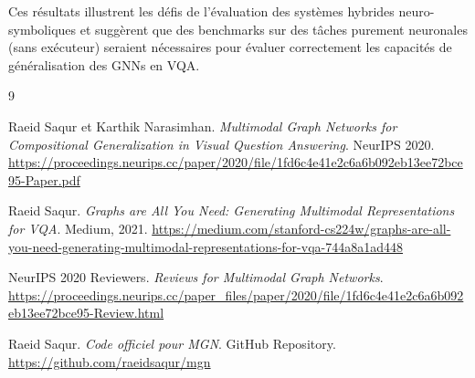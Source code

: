 \documentclass[a4paper,11pt]{article}
\begin{document}
Ces résultats illustrent les défis de l'évaluation des systèmes hybrides neuro-symboliques et suggèrent que des benchmarks sur des tâches purement neuronales (sans exécuteur) seraient nécessaires pour évaluer correctement les capacités de généralisation des GNNs en VQA.

\begin{thebibliography}{9}

Raeid Saqur et Karthik Narasimhan.
\textit{Multimodal Graph Networks for Compositional Generalization in Visual Question Answering}.
NeurIPS 2020.
\url{https://proceedings.neurips.cc/paper/2020/file/1fd6c4e41e2c6a6b092eb13ee72bce95-Paper.pdf}

Raeid Saqur.
\textit{Graphs are All You Need: Generating Multimodal Representations for VQA}.
Medium, 2021.
\url{https://medium.com/stanford-cs224w/graphs-are-all-you-need-generating-multimodal-representations-for-vqa-744a8a1ad448}

NeurIPS 2020 Reviewers.
\textit{Reviews for Multimodal Graph Networks}.
\url{https://proceedings.neurips.cc/paper_files/paper/2020/file/1fd6c4e41e2c6a6b092eb13ee72bce95-Review.html}

Raeid Saqur.
\textit{Code officiel pour MGN}.
GitHub Repository.
\url{https://github.com/raeidsaqur/mgn}

\end{thebibliography}
\end{document}
